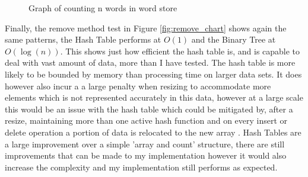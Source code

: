 \documentclass[12pt]{article}
\begin{document}
\begin{figure}[!htb]
\caption[The LOF caption]{Graph of counting n words in word store\footnotemark[1]}
\label{fig:count_chart}
\end{figure}

Finally, the remove method test in Figure \ref{fig:remove_chart} shows again the same patterns, the Hash Table performs at $O(1)$ and the Binary Tree at $O(\log(n))$. This shows just how efficient the hash table is, and is capable to deal with vast amount of data, more than I have tested. The hash table is more likely to be bounded by memory than processing time on larger data sets. It does however also incur a a large penalty when resizing to accommodate more elements which is not represented accurately in this data, however at a large scale this would be an issue with the hash table which could be mitigated by, after a resize, maintaining more than one active hash function and on every insert or delete operation a portion of data is relocated to the new array \cite{resizinghashtables}.
Hash Tables are a large improvement over a simple 'array and count' structure, there are still improvements that can be made to my implementation however it would also increase the complexity and my implementation still performs as expected.
\end{document}

